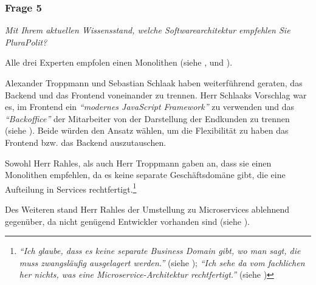 \subsubsection{Frage 5}
\label{sec:frage5}

\textit{Mit Ihrem aktuellen Wissensstand, welche Softwarearchitektur empfehlen Sie PluraPolit?}

Alle drei Experten empfolen einen Monolithen (siehe ,  und ).

Alexander Troppmann und Sebastian Schlaak haben weiterführend geraten, das Backend und das Frontend voneinander zu trennen. Herr Schlaaks Vorschlag war es, im Frontend ein \textit{\enquote{modernes JavaScript Framework}} zu verwenden und das \textit{\enquote{Backoffice}} der Mitarbeiter von der Darstellung der Endkunden zu trennen (siehe ). Beide würden den Ansatz wählen, um die Flexibilität zu haben das Frontend bzw. das Backend auszutauschen.

Sowohl Herr Rahles, als auch Herr Troppmann gaben an, dass sie einen Monolithen empfehlen, da es keine separate Geschäftsdomäne gibt, die eine Aufteilung in Services rechtfertigt.\footnote{
\textit{\enquote{Ich glaube, dass es keine separate Business Domain gibt, wo man sagt, die muss zwangsläufig ausgelagert werden.}} (siehe ); \textit{\enquote{Ich sehe da vom fachlichen her nichts, was eine Microservice-Architektur rechtfertigt.}} (siehe )
}

Des Weiteren stand Herr Rahles der Umstellung zu Microservices ablehnend gegenüber, da nicht genügend Entwickler vorhanden sind (siehe ).